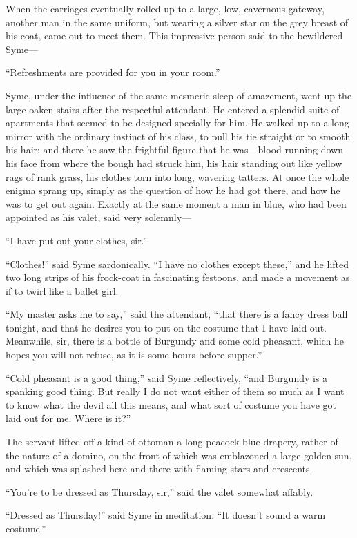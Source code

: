 When the carriages eventually rolled up to a large, low, cavernous gateway, another man in the same uniform, but wearing a silver star on the grey breast of his coat, came out to meet them. This impressive person said to the bewildered Syme⁠—

“Refreshments are provided for you in your room.”

Syme, under the influence of the same mesmeric sleep of amazement, went up the large oaken stairs after the respectful attendant. He entered a splendid suite of apartments that seemed to be designed specially for him. He walked up to a long mirror with the ordinary instinct of his class, to pull his tie straight or to smooth his hair; and there he saw the frightful figure that he was⁠—blood running down his face from where the bough had struck him, his hair standing out like yellow rags of rank grass, his clothes torn into long, wavering tatters. At once the whole enigma sprang up, simply as the question of how he had got there, and how he was to get out again. Exactly at the same moment a man in blue, who had been appointed as his valet, said very solemnly⁠—

“I have put out your clothes, sir.”

“Clothes!” said Syme sardonically. “I have no clothes except these,” and he lifted two long strips of his frock-coat in fascinating festoons, and made a movement as if to twirl like a ballet girl.

“My master asks me to say,” said the attendant, “that there is a fancy dress ball tonight, and that he desires you to put on the costume that I have laid out. Meanwhile, sir, there is a bottle of Burgundy and some cold pheasant, which he hopes you will not refuse, as it is some hours before supper.”

“Cold pheasant is a good thing,” said Syme reflectively, “and Burgundy is a spanking good thing. But really I do not want either of them so much as I want to know what the devil all this means, and what sort of costume you have got laid out for me. Where is it?”

The servant lifted off a kind of ottoman a long peacock-blue drapery, rather of the nature of a domino, on the front of which was emblazoned a large golden sun, and which was splashed here and there with flaming stars and crescents.

“You’re to be dressed as Thursday, sir,” said the valet somewhat affably.

“Dressed as Thursday!” said Syme in meditation. “It doesn’t sound a warm costume.”

